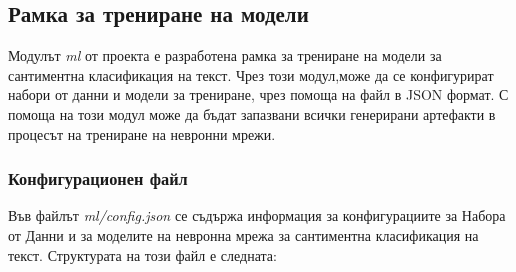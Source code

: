\documentclass{article}
\begin{document}
\subsection{Рамка за трениране на модели}

Модулът \textit{ml} от проекта е разработена рамка за трениране на модели за сантиментна класификация на текст. Чрез 
този модул,може да се конфигурират набори от данни и модели за трениране, чрез помоща на файл в JSON формат. С помоща 
на този модул може да бъдат запазвани всички генерирани артефакти в процесът на трениране на невронни мрежи.

\subsubsection{Конфигурационен файл}

Във файлът \textit{ml/config.json} се съдържа информация за конфигурациите за Набора от Данни и за моделите на невронна 
мрежа за сантиментна класификация на текст. Структурата на този файл е следната:
\end{document}
